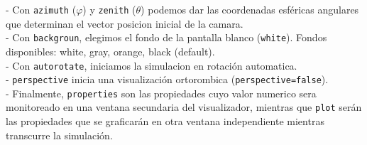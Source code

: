 \begin{enumerate}
- Con \verb+azimuth+ ($\varphi$) y \verb+zenith+ ($\theta$) podemos dar las coordenadas esf\'ericas angulares que determinan el vector posicion inicial de la camara.\\

- Con \verb+backgroun+, elegimos el fondo de la pantalla blanco (\verb+white+). Fondos disponibles: white, gray, orange, black (default).\\

- Con \verb+autorotate+, iniciamos la simulacion en rotaci\'on automatica.\\

- \verb+perspective+ inicia una visualizaci\'on ortorombica (\verb+perspective=false+).\\

- Finalmente, \verb+properties+ son las propiedades cuyo valor numerico sera monitoreado en una ventana secundaria del visualizador, mientras que \verb+plot+ ser\'an las propiedades que se graficar\'an en otra ventana independiente mientras transcurre la simulaci\'on.                         

\end{enumerate}


